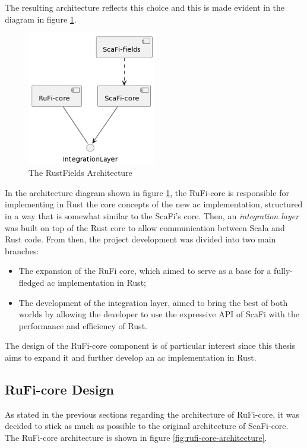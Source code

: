 The resulting architecture reflects this choice and this is made evident in the diagram in figure \ref{fig:rustfields-architecture}.

\begin{figure}[h]
    \centering
    \includegraphics[width=0.5\textwidth]{figures/diagrams/img/rustfields-full-architecture.png}
    \caption{The RustFields Architecture}
    \label{fig:rustfields-architecture}
\end{figure}

In the architecture diagram shown in figure \ref{fig:rustfields-architecture}, the RuFi-core is responsible for implementing in Rust the core concepts of the new \ac{ac} implementation,
structured in a way that is somewhat similar to the ScaFi's core. Then, an \textit{integration layer} was built on top of the Rust core to allow communication
between Scala and Rust code. From then, the project development was divided into two main branches:
\begin{itemize}
    \item The expansion of the RuFi core, which aimed to serve as a base for a fully-fledged \ac{ac} implementation in Rust;
    \item The development of the integration layer, aimed to bring the best of both worlds by allowing the developer to use the expressive API of ScaFi with the performance and efficiency of Rust.
\end{itemize}

The design of the RuFi-core component is of particular interest since this thesis aims to expand it and further develop an \ac{ac} implementation in Rust.

\subsection{RuFi-core Design}
As stated in the previous sections regarding the architecture of RuFi-core, it was decided to stick as much as possible to the original architecture of ScaFi-core.
The RuFi-core architecture is shown in figure \ref{fig:rufi-core-architecture}.

